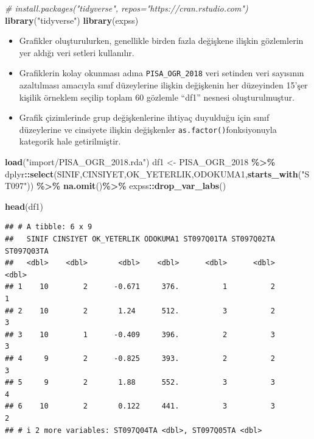 \documentclass[
  oneside]{book}
\newenvironment{Shaded}{\begin{snugshade}}{\end{snugshade}}
\newcommand{\CommentTok}[1]{\textcolor[rgb]{0.56,0.35,0.01}{\textit{#1}}}
\newcommand{\FunctionTok}[1]{\textcolor[rgb]{0.13,0.29,0.53}{\textbf{#1}}}
\newcommand{\NormalTok}[1]{#1}
\newcommand{\OtherTok}[1]{\textcolor[rgb]{0.56,0.35,0.01}{#1}}
\newcommand{\SpecialCharTok}[1]{\textcolor[rgb]{0.81,0.36,0.00}{\textbf{#1}}}
\newcommand{\StringTok}[1]{\textcolor[rgb]{0.31,0.60,0.02}{#1}}
\begin{document}
\begin{Shaded}
\begin{Highlighting}[]
\CommentTok{\# install.packages("tidyverse", repos="https://cran.rstudio.com")}
\FunctionTok{library}\NormalTok{(}\StringTok{"tidyverse"}\NormalTok{)}
\FunctionTok{library}\NormalTok{(expss)}
\end{Highlighting}
\end{Shaded}

\begin{itemize}
\item
  Grafikler oluşturulurken, genellikle birden fazla değişkene ilişkin gözlemlerin yer aldığı veri setleri kullanılır.
\item
  Grafiklerin kolay okunması adına \texttt{PISA\_OGR\_2018} veri setinden veri sayısının azaltılması amacıyla sınıf düzeylerine ilişkin değişkenin her düzeyinden 15'şer kişilik örneklem seçilip toplam 60 gözlemle ``df1'' nesnesi oluşturulmuştur.
\item
  Grafik çizimlerinde grup değişkenlerine ihtiyaç duyulduğu için sınıf düzeylerine ve cinsiyete ilişkin değişkenler \texttt{as.factor()}fonksiyonuyla kategorik hale getirilmiştir.
\end{itemize}

\begin{Shaded}
\begin{Highlighting}[]
\FunctionTok{load}\NormalTok{(}\StringTok{"import/PISA\_OGR\_2018.rda"}\NormalTok{)}
\NormalTok{df1 }\OtherTok{\textless{}{-}}\NormalTok{ PISA\_OGR\_2018 }\SpecialCharTok{\%\textgreater{}\%}
\NormalTok{dplyr}\SpecialCharTok{::}\FunctionTok{select}\NormalTok{(SINIF,CINSIYET,OK\_YETERLIK,ODOKUMA1,}\FunctionTok{starts\_with}\NormalTok{(}\StringTok{"ST097"}\NormalTok{))  }\SpecialCharTok{\%\textgreater{}\%}   
  \FunctionTok{na.omit}\NormalTok{()}\SpecialCharTok{\%\textgreater{}\%}
\NormalTok{ expss}\SpecialCharTok{::}\FunctionTok{drop\_var\_labs}\NormalTok{() }

\FunctionTok{head}\NormalTok{(df1)}
\end{Highlighting}
\end{Shaded}

\begin{verbatim}
## # A tibble: 6 x 9
##   SINIF CINSIYET OK_YETERLIK ODOKUMA1 ST097Q01TA ST097Q02TA ST097Q03TA
##   <dbl>    <dbl>       <dbl>    <dbl>      <dbl>      <dbl>      <dbl>
## 1    10        2      -0.671     376.          1          2          1
## 2    10        2       1.24      512.          3          2          3
## 3    10        1      -0.409     396.          2          3          3
## 4     9        2      -0.825     393.          2          2          3
## 5     9        2       1.88      552.          3          3          4
## 6    10        2       0.122     441.          3          3          2
## # i 2 more variables: ST097Q04TA <dbl>, ST097Q05TA <dbl>
\end{verbatim}
\end{document}
